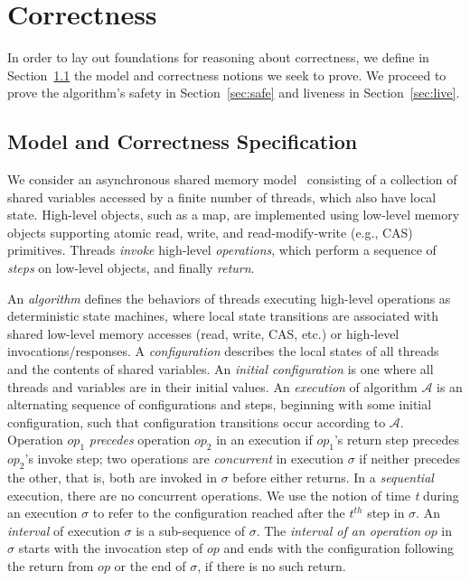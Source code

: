 \newcommand{\lp}[1]{LP(\ensuremath{#1})}

\section{Correctness}
\label{sec:proof}

In order to lay out foundations  for reasoning about correctness,  we  define in Section~\ref{sec:spec} the model and correctness notions we seek to prove. 
We proceed to prove the algorithm's safety in Section~\ref{sec:safe} and liveness in Section~\ref{sec:live}.

\subsection{Model and Correctness Specification}
\label{sec:spec}

We consider an asynchronous shared memory model~\cite{Welch2004} consisting of a collection of shared variables accessed by a finite number of threads, which also have local state.
High-level objects, such as a map, are implemented using low-level memory objects supporting atomic read, write, and read-modify-write (e.g., CAS) primitives. 
Threads  \emph{invoke} high-level \emph{operations}, which perform a sequence of  \emph{steps} on low-level objects, and finally \emph{return}.

An \emph{algorithm} defines the behaviors of threads executing high-level operations as deterministic state machines, where local state transitions are associated with  shared low-level memory 
accesses (read, write, CAS, etc.) or high-level invocations/responses.
A \emph{configuration} describes the  local states of all threads and the contents of shared variables. An \emph{initial configuration} is one where all threads and variables  are in their initial values.
An \emph{execution} of algorithm $\mathcal{A}$ is an alternating sequence of configurations and steps, beginning with some initial configuration, 
such that configuration transitions occur according to $\mathcal{A}$.
Operation $op_1$ \emph{precedes} operation $op_2$ in an execution if $op_1$'s return step precedes $op_2$'s invoke step;
two operations are \emph{concurrent} in execution $\sigma$  if neither precedes the other, that is, both are invoked in $\sigma$  before either returns.
 In a  \emph{sequential} execution, there are no concurrent operations.
We use the notion of time \emph{t} during an execution $\sigma$  to refer to the configuration reached after the $t^{th}$ step in $\sigma$.
An \emph{interval} of execution $\sigma$ is a sub-sequence of $\sigma$.
The \emph{interval of an operation} $op$ in $\sigma$  starts with the invocation step of $op$ and ends with the configuration following the return from $op$ or 
the end of $\sigma$, if there is no such return.

